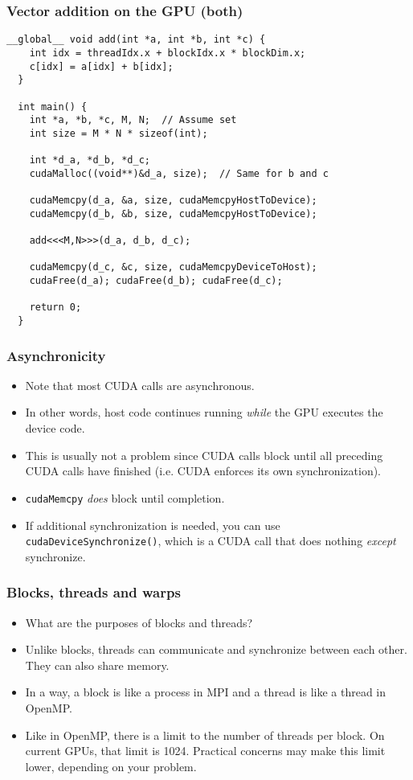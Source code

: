 \begin{frame}[fragile]
  \frametitle{Vector addition on the GPU (both)}
  \begin{lstlisting}[style=cuda, basicstyle=\ttfamily\scriptsize]
  __global__ void add(int *a, int *b, int *c) {
    int idx = threadIdx.x + blockIdx.x * blockDim.x;
    c[idx] = a[idx] + b[idx];
  }

  int main() {
    int *a, *b, *c, M, N;  // Assume set
    int size = M * N * sizeof(int);

    int *d_a, *d_b, *d_c;
    cudaMalloc((void**)&d_a, size);  // Same for b and c

    cudaMemcpy(d_a, &a, size, cudaMemcpyHostToDevice);
    cudaMemcpy(d_b, &b, size, cudaMemcpyHostToDevice);

    add<<<M,N>>>(d_a, d_b, d_c);

    cudaMemcpy(d_c, &c, size, cudaMemcpyDeviceToHost);
    cudaFree(d_a); cudaFree(d_b); cudaFree(d_c);

    return 0;
  }
  \end{lstlisting}
\end{frame}

\begin{frame}
  \frametitle{Asynchronicity}
  \begin{itemize}
  \item Note that most CUDA calls are asynchronous.
  \item In other words, host code continues running \emph{while} the GPU
    executes the device code.
  \item This is usually not a problem since CUDA calls block until all preceding
    CUDA calls have finished (i.e. CUDA enforces its own synchronization).
  \item \texttt{cudaMemcpy} \emph{does} block until completion.
  \item If additional synchronization is needed, you can use
    \texttt{cudaDeviceSynchronize()}, which is a CUDA call that does nothing
    \emph{except} synchronize.
  \end{itemize}
\end{frame}

\begin{frame}
  \frametitle{Blocks, threads and warps}
  \begin{itemize}
  \item What are the purposes of blocks and threads?
  \item Unlike blocks, threads can communicate and synchronize between each
    other. They can also share memory.
  \item In a way, a block is like a process in MPI and a thread is like a thread
    in OpenMP.
  \item Like in OpenMP, there is a limit to the number of threads per block. On
    current GPUs, that limit is 1024. Practical concerns may make this limit
    lower, depending on your problem.
  \end{itemize}
\end{frame}

